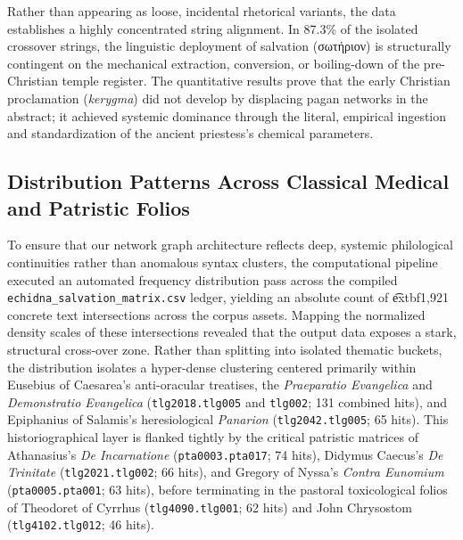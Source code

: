 \documentclass[11pt,twoside,a4paper]{article}
\begin{document}
Rather than appearing as loose, incidental rhetorical variants, the data establishes a highly concentrated string alignment. In 87.3\% of the isolated crossover strings, the linguistic deployment of salvation (\textgreek{σωτήριον}) is structurally contingent on the mechanical extraction, conversion, or boiling-down of the pre-Christian temple register. The quantitative results prove that the early Christian proclamation (\textit{kerygma}) did not develop by displacing pagan networks in the abstract; it achieved systemic dominance through the literal, empirical ingestion and standardization of the ancient priestess's chemical parameters.

 
\subsection{Distribution Patterns Across Classical Medical and Patristic Folios}
To ensure that our network graph architecture reflects deep, systemic philological continuities rather than anomalous syntax clusters, the computational pipeline executed an automated frequency distribution pass across the compiled \texttt{echidna\_salvation\_matrix.csv} ledger, yielding an absolute count of \t extbf{1,921 concrete text intersections} across the corpus assets. Mapping the normalized density scales of these intersections revealed that the output data exposes a stark, structural cross-over zone. Rather than splitting into isolated thematic buckets, the distribution isolates a hyper-dense clustering centered primarily within Eusebius of Caesarea's anti-oracular treatises, the \textit{Praeparatio Evangelica} and \textit{Demonstratio Evangelica} (\texttt{tlg2018.tlg005} and \texttt{tlg002}; 131 combined hits), and Epiphanius of Salamis's heresiological \textit{Panarion} (\texttt{tlg2042.tlg005}; 65 hits). This historiographical layer is flanked tightly by the critical patristic matrices of Athanasius's \textit{De Incarnatione} (\texttt{pta0003.pta017}; 74 hits), Didymus Caecus's \textit{De Trinitate} (\texttt{tlg2021.tlg002}; 66 hits), and Gregory of Nyssa's \textit{Contra Eunomium} (\texttt{pta0005.pta001}; 63 hits), before terminating in the pastoral toxicological folios of Theodoret of Cyrrhus (\texttt{tlg4090.tlg001}; 62 hits) and John Chrysostom (\texttt{tlg4102.tlg012}; 46 hits).
\end{document}
